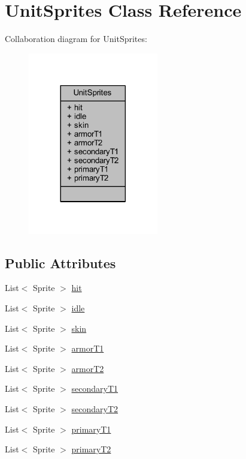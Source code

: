 \hypertarget{class_unit_sprites}{}\section{Unit\+Sprites Class Reference}
\label{class_unit_sprites}


Collaboration diagram for Unit\+Sprites\+:
\nopagebreak
\begin{figure}[H]
\begin{center}
\leavevmode
\includegraphics[width=161pt]{class_unit_sprites__coll__graph}
\end{center}
\end{figure}
\subsection*{Public Attributes}
\begin{DoxyCompactItemize}
\item 
List$<$ Sprite $>$ \mbox{\hyperlink{class_unit_sprites_a04dea1b07a4c9d2268e710338281d8f6}{hit}}
\item 
List$<$ Sprite $>$ \mbox{\hyperlink{class_unit_sprites_a7dab10edddb2f02aac97a699ad4bd877}{idle}}
\item 
List$<$ Sprite $>$ \mbox{\hyperlink{class_unit_sprites_a0fb8aecfe21f48454c0ff88e3e62b46b}{skin}}
\item 
List$<$ Sprite $>$ \mbox{\hyperlink{class_unit_sprites_a240fd076990a1d5415b0bf646811def5}{armor\+T1}}
\item 
List$<$ Sprite $>$ \mbox{\hyperlink{class_unit_sprites_a067a815643b14259b578d068a89fe847}{armor\+T2}}
\item 
List$<$ Sprite $>$ \mbox{\hyperlink{class_unit_sprites_ad5ba8963e97a5efd3bb56be95e573b1e}{secondary\+T1}}
\item 
List$<$ Sprite $>$ \mbox{\hyperlink{class_unit_sprites_afce363dd582be88b65df9b081a932400}{secondary\+T2}}
\item 
List$<$ Sprite $>$ \mbox{\hyperlink{class_unit_sprites_a628613428a3a72eacba6610e0b332a51}{primary\+T1}}
\item 
List$<$ Sprite $>$ \mbox{\hyperlink{class_unit_sprites_a2991644582def68ae1ab58e7f887acb8}{primary\+T2}}
\end{DoxyCompactItemize}


